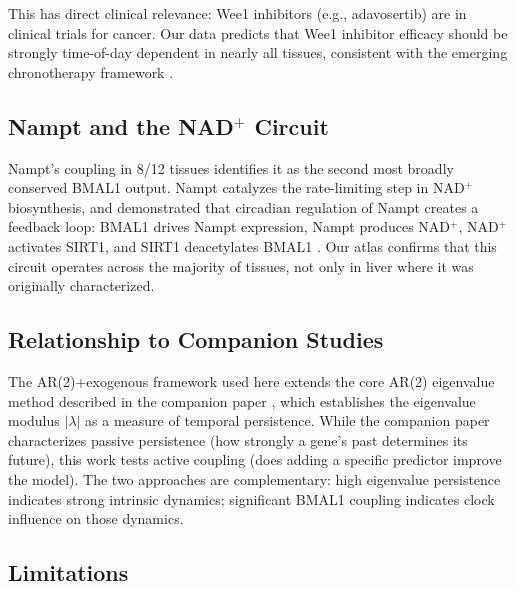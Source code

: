 \documentclass[11pt,letterpaper]{article}
\begin{document}
This has direct clinical relevance: Wee1 inhibitors (e.g., adavosertib) are in clinical trials for cancer. Our data predicts that Wee1 inhibitor efficacy should be strongly time-of-day dependent in nearly all tissues, consistent with the emerging chronotherapy framework \citep{dallmann2016chronopharmacology}.

\subsection{Nampt and the NAD$^+$ Circuit}

Nampt's coupling in 8/12 tissues identifies it as the second most broadly conserved BMAL1 output. Nampt catalyzes the rate-limiting step in NAD$^+$ biosynthesis, and \citet{ramsey2009circadian} demonstrated that circadian regulation of Nampt creates a feedback loop: BMAL1 drives Nampt expression, Nampt produces NAD$^+$, NAD$^+$ activates SIRT1, and SIRT1 deacetylates BMAL1 \citep{nakahata2009circadian, revollo2004nampt}. Our atlas confirms that this circuit operates across the majority of tissues, not only in liver where it was originally characterized.

\subsection{Relationship to Companion Studies}

The AR(2)+exogenous framework used here extends the core AR(2) eigenvalue method described in the companion paper \citep{whiteside2026par2a}, which establishes the eigenvalue modulus $|\lambda|$ as a measure of temporal persistence. While the companion paper characterizes passive persistence (how strongly a gene's past determines its future), this work tests active coupling (does adding a specific predictor improve the model). The two approaches are complementary: high eigenvalue persistence indicates strong intrinsic dynamics; significant BMAL1 coupling indicates clock influence on those dynamics.

\subsection{Limitations}
\end{document}
